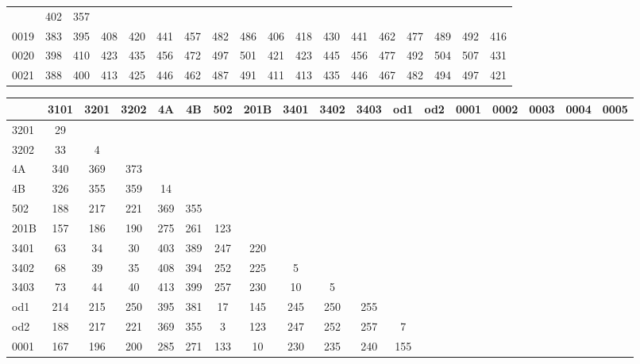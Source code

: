 \begin{table}[htbp]
\begin{center}
{\begin{tabular}{lccccccccccccccccc}
							       & 402 &
								       357 \\
0019 & 383 & 395 & 408 & 420 & 441 & 457 & 482 & 486 & 406 & 418 & 430 &
						   441 & 462 & 477 & 489
							       & 492 &
								       416 \\
0020 & 398 & 410 & 423 & 435 & 456 & 472 & 497 & 501 & 421 & 423 & 445 &
						   456 & 477 & 492 & 504
							       & 507 &
								       431 \\
0021 & 388 & 400 & 413 & 425 & 446 & 462 & 487 & 491 & 411 & 413 & 435 &
						   446 & 467 & 482 & 494
							       & 497 &
								       421 \\
\hline
%
  \end{tabular}
  }
 \end{center}
\end{table}


\begin{table}[htbp]
 \begin{center}
  {\tiny
  \begin{tabular}{lccccccccccccccccc}
%
\hline
 & 3101 & 3201 & 3202 & 4A & 4B & 502 & 201B & 3401 & 3402 & 3403 & od1
   & od2 & 0001 & 0002 & 0003 & 0004 & 0005 \\
\hline
3201 & 29 &  &  &  &  &  &  &  &  &  &  &  &  &  &  &  &  \\
3202 & 33 & 4 &  &  &  &  &  &  &  &  &  &  &  &  &  &  &  \\
4A & 340 & 369 & 373 &  &  &  &  &  &  &  &  &  &  &  &  &  &  \\
4B & 326 & 355 & 359 & 14 &  &  &  &  &  &  &  &  &  &  &  &  &  \\
502 & 188 & 217 & 221 & 369 & 355 &  &  &  &  &  &  &  &  &  &  &  &  \\
201B & 157 & 186 & 190 & 275 & 261 & 123 &  &  &  &  &  &  &  &  &  &  &  \\
3401 & 63 & 34 & 30 & 403 & 389 & 247 & 220 &  &  &  &  &  &  &  &  &  &  \\
3402 & 68 & 39 & 35 & 408 & 394 & 252 & 225 & 5 &  &  &  &  &  &  &  &
								   &  \\
3403 & 73 & 44 & 40 & 413 & 399 & 257 & 230 & 10 & 5 &  &  &  &  &  &  &
								   &  \\
od1 & 214 & 215 & 250 & 395 & 381 & 17 & 145 & 245 & 250 & 255 &  &  &
						       &  &  &  &  \\
od2 & 188 & 217 & 221 & 369 & 355 & 3 & 123 & 247 & 252 & 257 & 7 &  &
						       &  &  &  &  \\
0001 & 167 & 196 & 200 & 285 & 271 & 133 & 10 & 230 & 235 & 240 & 155 &

\end{tabular}}
\end{center}
\end{table}
